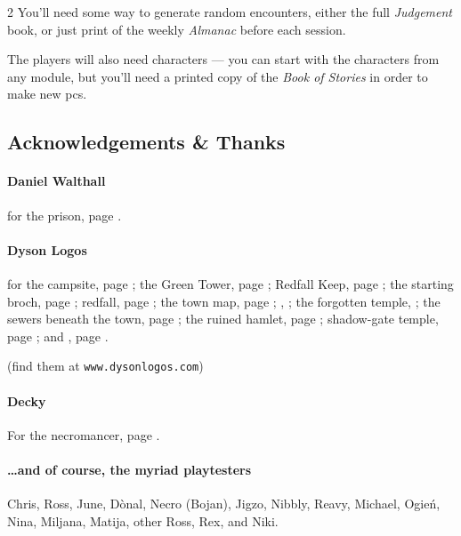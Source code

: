 \begin{multicols}{2}
You'll need some way to generate random encounters, either the full \textit{Judgement} book, or just print of the weekly \textit{Almanac} before each session.

The players will also need characters --- you can start with the characters from any module, but you'll need a printed copy of the \textit{Book of Stories} in order to make new \glspl{pc}.

\columnbreak

\subsection*{Acknowledgements \& Thanks}

\paragraph{Daniel Walthall}
for the prison, page \pageref{Daniel_Walthall/prison}.

\paragraph{Dyson Logos}

for the
campsite, page \pageref{Dyson_Logos/forgotten_city};
the Green Tower, page \pageref{Dyson_Logos/green_tower};
Redfall Keep, page \pageref{Dyson_Logos/redfall_keep};
the starting \gls{broch}, page \pageref{Dyson_Logos/broch_map};
\gls{redfall}, page \pageref{Dyson_Logos/redfall};
the town map, page \pageref{Dyson_Logos/town};
, \pageref{Dyson_Logos/mincing_pig};
the forgotten temple, \pageref{Dyson_Logos/qualme_temple};
the sewers beneath the town, page \pageref{Dyson_Logos/sewer};
the ruined hamlet, page \pageref{Dyson_Logos/ruined_village};
shadow-gate temple, page \pageref{Dyson_Logos/shadow_gate};
and
 , page \pageref{Dyson_Logos/lochside}.

(find them at {\tt www.dysonlogos.com})

\paragraph{Decky}

For the necromancer, page \pageref{Decky/necromancer}.

\paragraph{\ldots and of course, the myriad playtesters}
Chris, Ross, June, D\`onal,
Necro (Bojan), Jigzo, Nibbly, Reavy,
Michael, Ogie\'n,
Nina, Miljana, Matija, other Ross, Rex, and
Niki.


\end{multicols}
